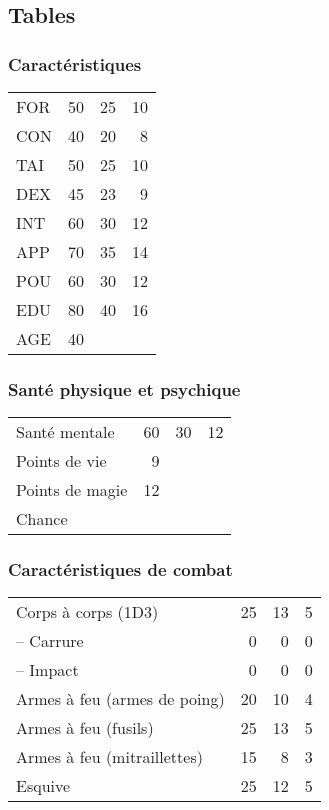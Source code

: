 \documentclass[11pt]{article}
\begin{document}
\begin{twocols}

\subsection{Tables}
\label{sec:orgbbc942e}
\subsubsection{Caractéristiques}
\label{sec:orgcf126fe}

\begin{center}
\begin{tabular}{lrrr}
FOR & 50 & 25 & 10\\
CON & 40 & 20 & 8\\
TAI & 50 & 25 & 10\\
DEX & 45 & 23 & 9\\
INT & 60 & 30 & 12\\
APP & 70 & 35 & 14\\
POU & 60 & 30 & 12\\
EDU & 80 & 40 & 16\\
AGE & 40 &  & \\
\end{tabular}
\end{center}

\subsubsection{Santé physique et psychique}
\label{sec:org054f18a}

\begin{center}
\begin{tabular}{lrrr}
Santé mentale & 60 & 30 & 12\\
Points de vie & 9 &  & \\
Points de magie & 12 &  & \\
Chance &  &  & \\
\end{tabular}
\end{center}

\subsubsection{Caractéristiques de combat}
\label{sec:org3899202}

\begin{center}
\begin{tabular}{lrrr}
Corps à corps (1D3) & 25 & 13 & 5\\
-- Carrure & 0 & 0 & 0\\
-- Impact & 0 & 0 & 0\\
Armes à feu (armes de poing) & 20 & 10 & 4\\
Armes à feu (fusils) & 25 & 13 & 5\\
Armes à feu (mitraillettes) & 15 & 8 & 3\\
Esquive & 25 & 12 & 5\\
\end{tabular}
\end{center}


\end{twocols}
\end{document}
